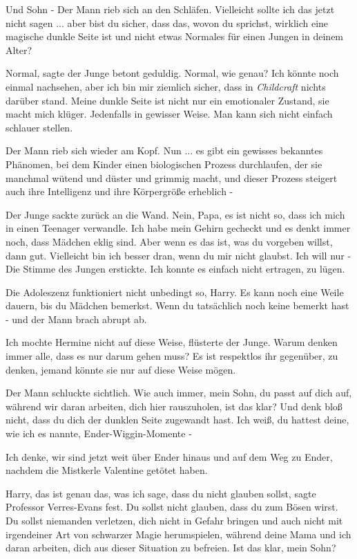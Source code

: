 \glqq{}Und Sohn -\grqq{} Der Mann rieb sich an den Schläfen. \glqq{}Vielleicht
sollte ich das jetzt nicht sagen ... aber bist du sicher, dass das, wovon du
sprichst, wirklich eine magische dunkle Seite ist und nicht etwas Normales für
einen Jungen in deinem Alter?\grqq{}

\glqq{}Normal\grqq{}, sagte der Junge betont geduldig. \glqq{}Normal, wie genau?
Ich könnte noch einmal nachsehen, aber ich bin mir ziemlich sicher, dass in
\emph{Childcraft} nichts darüber stand. Meine dunkle Seite ist nicht nur ein
emotionaler Zustand, sie macht mich klüger. Jedenfalls in gewisser Weise. Man
kann sich nicht einfach schlauer stellen.\grqq{}

Der Mann rieb sich wieder am Kopf. \glqq{}Nun ... es gibt ein gewisses bekanntes
Phänomen, bei dem Kinder einen biologischen Prozess durchlaufen, der sie
manchmal wütend und düster und grimmig macht, und dieser Prozess steigert auch
ihre Intelligenz und ihre Körpergröße erheblich -\grqq{}

Der Junge sackte zurück an die Wand. \glqq{}Nein, Papa, es ist nicht so, dass ich
mich in einen Teenager verwandle. Ich habe mein Gehirn gecheckt und es denkt
immer noch, dass Mädchen eklig sind. Aber wenn es das ist, was du vorgeben
willst, dann gut. Vielleicht bin ich besser dran, wenn du mir nicht glaubst. Ich
will nur -\grqq{} Die Stimme des Jungen erstickte. \glqq{}Ich konnte es einfach
nicht ertragen, zu lügen.\grqq{}

\glqq{}Die Adoleszenz funktioniert nicht unbedingt so, Harry. Es kann noch eine
Weile dauern, bis du Mädchen bemerkst. Wenn du tatsächlich noch keine bemerkt
hast -\grqq{} und der Mann brach abrupt ab.

\glqq{}Ich mochte Hermine nicht auf diese Weise\grqq{}, flüsterte der Junge.
\glqq{}Warum denken immer alle, dass es nur darum gehen muss? Es ist respektlos
ihr gegenüber, zu denken, jemand könnte sie nur auf diese Weise mögen.\grqq{}

Der Mann schluckte sichtlich. \glqq{}Wie auch immer, mein Sohn, du passt auf dich
auf, während wir daran arbeiten, dich hier rauszuholen, ist das klar? Und denk
bloß nicht, dass du dich der dunklen Seite zugewandt hast. Ich weiß, du hattest
deine, wie ich es nannte, Ender-Wiggin-Momente -\grqq{}

\glqq{}Ich denke, wir sind jetzt weit über Ender hinaus und auf dem Weg zu Ender,
nachdem die Mistkerle Valentine getötet haben.\grqq{}

\glqq{}Harry, das ist genau das, was ich sage, dass du nicht glauben
sollst\grqq{}, sagte Professor Verres-Evans fest. \glqq{}Du sollst nicht glauben,
dass du zum Bösen wirst. Du sollst niemanden verletzen, dich nicht in Gefahr
bringen und auch nicht mit irgendeiner Art von schwarzer Magie herumspielen,
während deine Mama und ich daran arbeiten, dich aus dieser Situation zu befreien.
Ist das klar, mein Sohn?\grqq{}

